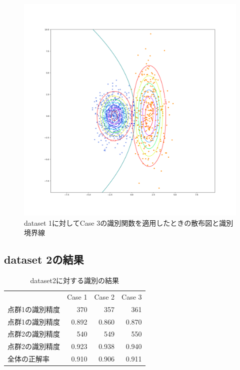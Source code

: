 \documentclass[class=jsarticle, crop=false, dvipdfmx, fleqn]{standalone}
\begin{document}
\begin{figure}
    \centering
    \includegraphics[clip, width=\linewidth]{../figures/result_assignment1_dataset1_case3.png}
    \caption{dataset 1に対してCase 3の識別関数を適用したときの散布図と識別境界線}
    \label{fig:result_dataset1_case3}
\end{figure}



\clearpage
\subsection*{dataset 2の結果}

\begin{table}[H]
    \centering
    \caption{dataset2に対する識別の結果}
    \begin{tabular}{lrrr}
            & Case 1 & Case 2 & Case 3 \\
        点群1の識別精度 & 370 & 357 & 361 \\
        点群1の識別精度 & 0.892 & 0.860 & 0.870 \\
        点群2の識別精度 & 540 & 549 & 550 \\
        点群2の識別精度 & 0.923 & 0.938 & 0.940 \\
        全体の正解率 & 0.910 & 0.906 & 0.911
    \end{tabular}
    \label{tab:dataset2_result}
\end{table}
\end{document}
